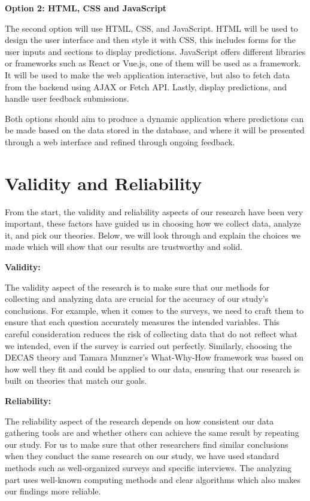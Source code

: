 \textbf{Option 2: HTML, CSS and JavaScript}


The second option will use HTML, CSS, and JavaScript. HTML will be used to design the user interface and then style it with CSS, this includes forms for the user inputs and sections to display predictions.  JavaScript offers different libraries or frameworks such as React or Vue.js, one of them will be used as a framework. It will be used to make the web application interactive, but also to fetch data from the backend using AJAX or Fetch API. Lastly, display predictions, and handle user feedback submissions.


Both options should aim to produce a dynamic application where predictions can be made based on the data stored in the database, and where it will be presented through a web interface and refined through ongoing feedback.

\section{Validity and Reliability}
From the start, the validity and reliability aspects of our research have been very important, these factors have guided us in choosing how we collect data, analyze it, and pick our theories. Below, we will look through and explain the choices we made which will show that our results are trustworthy and solid.  


\textbf{Validity:}


The validity aspect of the research is to make sure that our methods for collecting and analyzing data are crucial for the accuracy of our study’s conclusions.  For example, when it comes to the surveys, we need to craft them to ensure that each question accurately measures the intended variables. This careful consideration reduces the risk of collecting data that do not reflect what we intended, even if the survey is carried out perfectly. Similarly, choosing the DECAS theory and Tamara Munzner's What-Why-How framework was based on how well they fit and could be applied to our data, ensuring that our research is built on theories that match our goals.


\textbf{Reliability:}


The reliability aspect of the research depends on how consistent our data gathering tools are and whether others can achieve the same result by repeating our study. For us to make sure that other researchers find similar conclusions when they conduct the same research on our study, we have used standard methods such as well-organized surveys and specific interviews. The analyzing part uses well-known computing methods and clear algorithms which also makes our findings more reliable.
